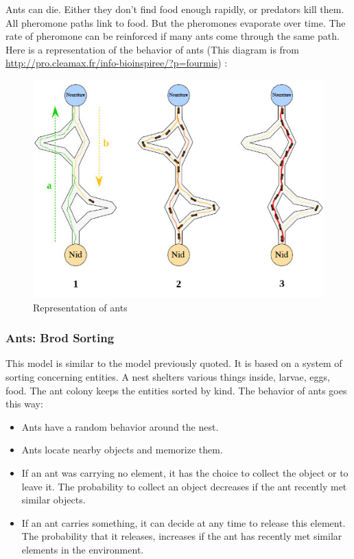 Ants can die. Either they don't find food enough rapidly, or predators kill them.\\
All pheromone paths link to food. But the pheromones evaporate over time. The rate of pheromone can be reinforced if many ants come through the same path.\\
Here is a representation of the behavior of ants (This diagram is from \url{http://pro.cleamax.fr/info-bioinspiree/?p=fourmis}) :

\begin{figure}[h]
\center
\includegraphics{../images/SchemaFourmi.png}
\caption{\label{AntsRepresentation}Representation of ants}
\end{figure}

\newpage

\subsubsection{Ants: Brod Sorting}

This model is similar to the model previously quoted. It is based on a system of sorting concerning entities. A nest shelters various things inside, larvae, eggs, food. The ant colony keeps the entities sorted by kind.
The behavior of ants goes this way:

\begin{itemize}
\item Ants have a random behavior around the nest.
\item Ants locate nearby objects and memorize them.
\item If an ant was carrying no element, it has the choice to collect the object or to leave it. The probability to collect an object decreases if the ant recently met similar objects.
\item If an ant carries something, it can decide at any time to release this element. The probability that it releases, increases if the ant has recently met similar elements in the environment.
\end{itemize}

